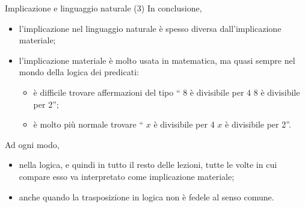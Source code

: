 \documentclass[10pt,dvipsnames]{beamer}
\begin{document}
\begin{frame}{Implicazione e linguaggio naturale (3)}
    In conclusione,
    \begin{itemize}
        \item l'implicazione nel linguaggio naturale è spesso diversa dall'implicazione materiale;
        \item l'implicazione materiale è molto usata in matematica, ma quasi sempre nel mondo della logica dei predicati:
              \begin{itemize}
                  \item è difficile trovare affermazioni del tipo `` 8 è divisibile per 4  8 è divisibile per 2'';
                  \item è molto più normale trovare `` $x$ è divisibile per 4  $x$ è divisibile per 2''.
              \end{itemize}
    \end{itemize}
    \pause
    Ad ogni modo,
    \begin{itemize}
        \item nella logica, e quindi in tutto il resto delle lezioni, tutte le volte in cui compare  esso va interpretato come implicazione materiale;
        \item anche quando la trasposizione in logica non è fedele al senso comune.
    \end{itemize}
\end{frame}
\end{document}
